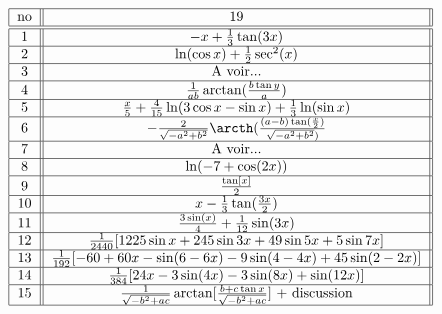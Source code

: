 \[ \begin{tabular}{| c || c ||  }
\hline       no &         ${ 19}                                          $                                                                                                               \\    \hline \hline
             $1$   & $-x+\frac{1}{3}\tan(3x)$            \\ \hline 
            $2$   &  $ \ln(\cos x)+\frac{1}{2}\sec^2(x)$                 \\ \hline
           $3$   &   A voir...						\\ \hline 
           $4$   &      $   \frac{1}{ab}\arctan(\frac{b\tan y}{a})             $     \\ \hline 
              $5$   &      $  \frac{x}{5}+\frac{4}{15}\ln(3\cos x-\sin x) + \frac{1}{3}\ln(\sin x)    $   				 \\ \hline
               $6$  &      $-\frac{2}{\sqrt{-a^2+b^2}}\arcth(\frac{(a-b)\tan(\frac{x}{2})}{\sqrt{-a^2+b^2})}$                \\ \hline
              $7$ &     A voir...                       \\ \hline
               $8$ &     $\ln(-7 + \cos(2 x))$  			                                                                                \\ \hline
              $9$     &     $\frac{\tan[x]}{2}$  			                                                                       \\ \hline
               $10$  &  $x - \frac{1}{3}\tan(\frac{3x}{2})$  			                                                               \\ \hline
              $11$  &  $\frac{3\sin(x)}{4}+\frac{1}{12}\sin(3x)$			                                                               \\ \hline   
               $12$ &  $\frac{1}{2440}[1225\sin x +245\sin 3x+49\sin 5x + 5\sin 7x]$			                                                               \\ \hline   
              $13$  &  $\frac{1}{192}[-60+60x -\sin(6-6x) -9\sin(4-4x)+45\sin(2-2x)]$			                                                               \\ \hline   
              $14$  &  $\frac{1}{384}[24x -3\sin(4x) -3\sin(8x)+\sin(12x)]$			                                                               \\ \hline   
              $15$  &  $\frac{1}{\sqrt{-b^2+ac}}\arctan[\frac{b+c\tan x}{\sqrt{-b^2+ac}}]$ + discussion			                                                               \\ \hline   

\end{tabular}\]
